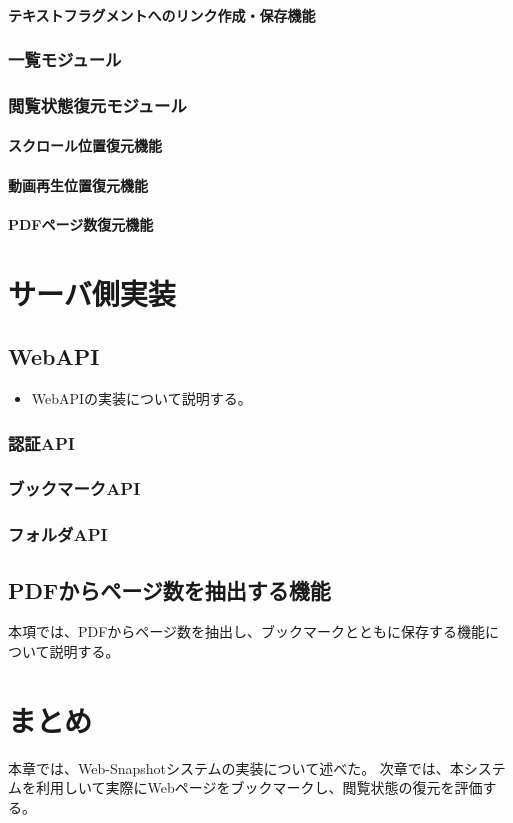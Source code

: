 \paragraph{テキストフラグメントへのリンク作成・保存機能}

\subsubsection{一覧モジュール}


\subsubsection{閲覧状態復元モジュール}

\paragraph{スクロール位置復元機能}


\paragraph{動画再生位置復元機能}


\paragraph{PDFページ数復元機能}

\section{サーバ側実装}


\subsection{WebAPI}
\begin{itemize}
  \item WebAPIの実装について説明する。
\end{itemize}

\subsubsection{認証API}
\subsubsection{ブックマークAPI}


\subsubsection{フォルダAPI}

\subsection{PDFからページ数を抽出する機能}
本項では、PDFからページ数を抽出し、ブックマークとともに保存する機能について説明する。



\section{まとめ}
本章では、Web-Snapshotシステムの実装について述べた。
次章では、本システムを利用しいて実際にWebページをブックマークし、閲覧状態の復元を評価する。